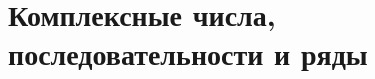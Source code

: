 \documentclass[../main.tex]{subfiles}
\begin{document}
 \chapter{Комплексные числа, последовательности и ряды}
 
\end{document}
